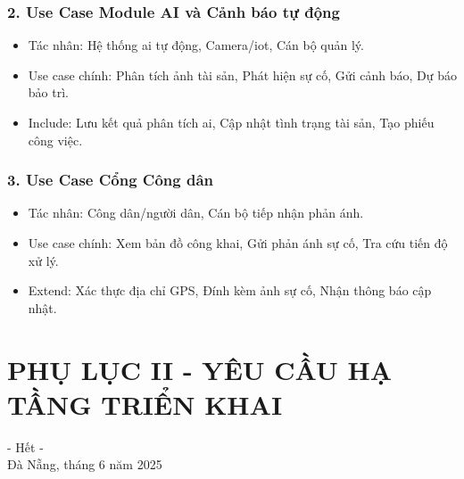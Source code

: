 \subsubsection*{2. Use Case Module AI và Cảnh báo tự động}
\begin{itemize}
    \item Tác nhân: Hệ thống \gls{ai} tự động, Camera/\gls{iot}, Cán bộ quản lý.
    \item Use case chính: Phân tích ảnh tài sản, Phát hiện sự cố, Gửi cảnh báo, Dự báo bảo trì.
    \item Include: Lưu kết quả phân tích \gls{ai}, Cập nhật tình trạng tài sản, Tạo phiếu công việc.
\end{itemize}

\subsubsection*{3. Use Case Cổng Công dân}
\begin{itemize}
    \item Tác nhân: Công dân/người dân, Cán bộ tiếp nhận phản ánh.
    \item Use case chính: Xem bản đồ công khai, Gửi phản ánh sự cố, Tra cứu tiến độ xử lý.
    \item Extend: Xác thực địa chỉ GPS, Đính kèm ảnh sự cố, Nhận thông báo cập nhật.
\end{itemize}
\cleardoublepage
\section*{PHỤ LỤC II - YÊU CẦU HẠ TẦNG TRIỂN KHAI}


\vspace{1cm}
\begin{flushright}
- \centering Hết - \\
\centering Đà Nẵng, tháng 6 năm 2025
\end{flushright}